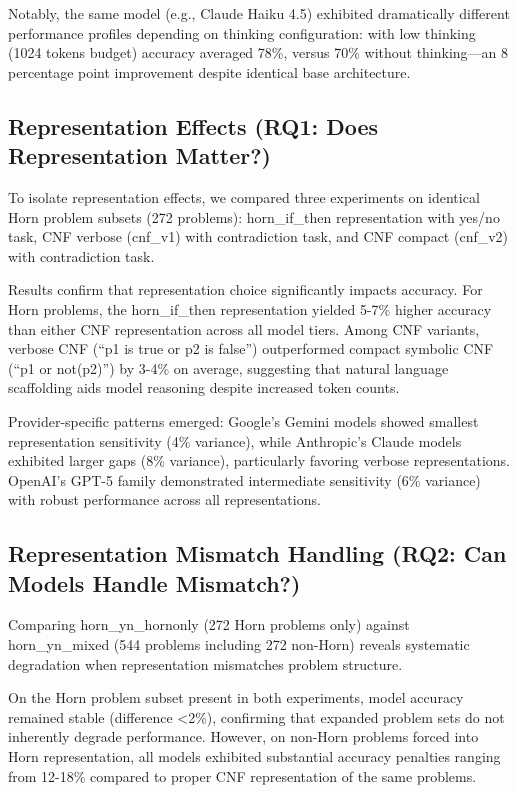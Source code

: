 \documentclass[pdflatex,sn-mathphys-num]{sn-jnl}%
\theoremstyle{thmstyleone}%
\theoremstyle{thmstyletwo}%
\theoremstyle{thmstylethree}%
\begin{document}
Notably, the same model (e.g., Claude Haiku 4.5) exhibited dramatically different performance profiles depending on thinking configuration: with low thinking (1024 tokens budget) accuracy averaged 78\%, versus 70\% without thinking—an 8 percentage point improvement despite identical base architecture.

\subsection{Representation Effects (RQ1: Does Representation Matter?)}\label{subsec:representation}

To isolate representation effects, we compared three experiments on identical Horn problem subsets (272 problems): horn\_if\_then representation with yes/no task, CNF verbose (cnf\_v1) with contradiction task, and CNF compact (cnf\_v2) with contradiction task.

Results confirm that representation choice significantly impacts accuracy. For Horn problems, the horn\_if\_then representation yielded 5-7\% higher accuracy than either CNF representation across all model tiers. Among CNF variants, verbose CNF (``p1 is true or p2 is false'') outperformed compact symbolic CNF (``p1 or not(p2)'') by 3-4\% on average, suggesting that natural language scaffolding aids model reasoning despite increased token counts.

Provider-specific patterns emerged: Google's Gemini models showed smallest representation sensitivity (4\% variance), while Anthropic's Claude models exhibited larger gaps (8\% variance), particularly favoring verbose representations. OpenAI's GPT-5 family demonstrated intermediate sensitivity (6\% variance) with robust performance across all representations.

\subsection{Representation Mismatch Handling (RQ2: Can Models Handle Mismatch?)}\label{subsec:mismatch}

Comparing horn\_yn\_hornonly (272 Horn problems only) against horn\_yn\_mixed (544 problems including 272 non-Horn) reveals systematic degradation when representation mismatches problem structure.

On the Horn problem subset present in both experiments, model accuracy remained stable (difference <2\%), confirming that expanded problem sets do not inherently degrade performance. However, on non-Horn problems forced into Horn representation, all models exhibited substantial accuracy penalties ranging from 12-18\% compared to proper CNF representation of the same problems.
\end{document}
